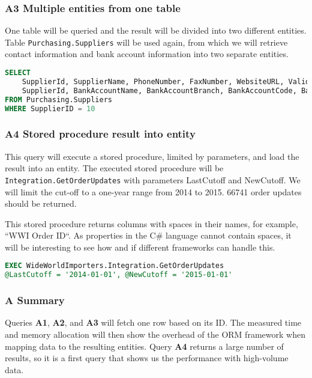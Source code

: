 \subsubsection*{A3 Multiple entities from one table}
One table will be queried and the result will be divided into two different entities. 
Table \texttt{Purchasing.Suppliers} will be used again, from which we will retrieve contact information and bank account information into two separate entities. 

\begin{lstlisting}[language=SQL]
SELECT 
    SupplierId, SupplierName, PhoneNumber, FaxNumber, WebsiteURL, ValidFrom, ValidTo, 
    SupplierId, BankAccountName, BankAccountBranch, BankAccountCode, BankAccountNumber, BankInternationalCode 
FROM Purchasing.Suppliers 
WHERE SupplierID = 10
\end{lstlisting}

\subsubsection*{A4 Stored procedure result into entity}
This query will execute a stored procedure, limited by parameters, and load the result into an entity.
The executed stored procedure will be \texttt{Integration.GetOrderUpdates} with parameters LastCutoff and NewCutoff. 
We will limit the cut-off to a one-year range from 2014 to 2015. 66741 order updates should be returned.

This stored procedure returns columns with spaces in their names, for example, ``WWI Order ID``. As properties in the C\# language cannot contain spaces, it will be interesting to see how and if different frameworks can handle this.

\begin{lstlisting}[language=SQL]
EXEC WideWorldImporters.Integration.GetOrderUpdates 
@LastCutoff = '2014-01-01', @NewCutoff = '2015-01-01'
\end{lstlisting}

\subsubsection*{A Summary}
Queries \textbf{A1}, \textbf{A2}, and \textbf{A3} will fetch one row based on its ID. The measured time and memory allocation will then show the overhead of the ORM framework when mapping data to the resulting entities. Query \textbf{A4} returns a large number of results, so it is a first query that shows us the performance with high-volume data.

